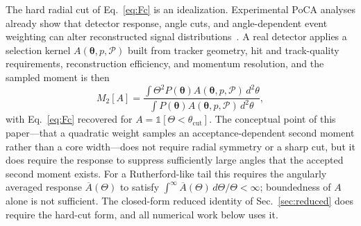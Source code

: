 \documentclass[aps,pra,reprint,longbibliography,floatfix]{revtex4-2}
\newcommand{\thetacut}{\ensuremath{\theta_{\mathrm{cut}}}}
\newcommand{\pathP}{\ensuremath{\mathcal{P}}}
\begin{document}
The hard radial cut of Eq.~\eqref{eq:Fc} is an idealization.  Experimental PoCA analyses already show that detector response, angle cuts, and angle-dependent event weighting can alter reconstructed signal distributions~\cite{riggi2021}.  A real detector applies a selection kernel $A(\bm{\theta},p,\pathP)$ built from tracker geometry, hit and track-quality requirements, reconstruction efficiency, and momentum resolution, and the sampled moment is then
\begin{equation}\label{eq:M2_kernel}
M_2[A]=\frac{\int \Theta^2 P(\bm{\theta})A(\bm{\theta},p,\pathP)\,d^2\theta}
{\int P(\bm{\theta})A(\bm{\theta},p,\pathP)\,d^2\theta},
\end{equation}
with Eq.~\eqref{eq:Fc} recovered for $A=\mathbb{1}[\Theta<\thetacut]$.  The conceptual point of this paper---that a quadratic weight samples an acceptance-dependent second moment rather than a core width---does not require radial symmetry or a sharp cut, but it does require the response to suppress sufficiently large angles that the accepted second moment exists.  For a Rutherford-like tail this requires the angularly averaged response $\overline A(\Theta)$ to satisfy $\int^\infty \overline A(\Theta)\,d\Theta/\Theta<\infty$; boundedness of $A$ alone is not sufficient.  The closed-form reduced identity of Sec.~\ref{sec:reduced} does require the hard-cut form, and all numerical work below uses it.
\end{document}
